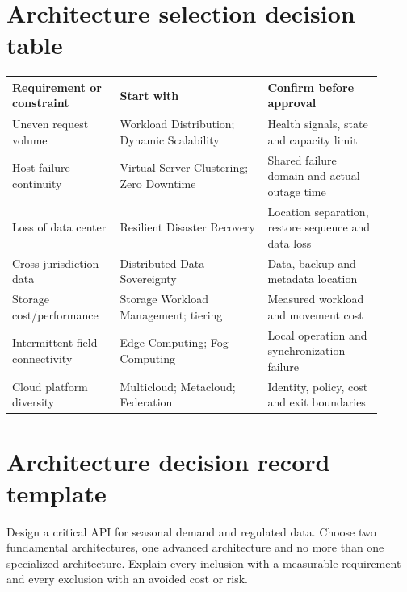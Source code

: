 \documentclass[10pt,letterpaper]{article}
\begin{document}
\section{Architecture selection decision table}
\small\begin{longtable}{p{0.26\linewidth}p{0.36\linewidth}p{0.29\linewidth}}
\toprule Requirement or constraint & Start with & Confirm before approval \\\midrule
Uneven request volume & Workload Distribution; Dynamic Scalability & Health signals, state and capacity limit \\
Host failure continuity & Virtual Server Clustering; Zero Downtime & Shared failure domain and actual outage time \\
Loss of data center & Resilient Disaster Recovery & Location separation, restore sequence and data loss \\
Cross-jurisdiction data & Distributed Data Sovereignty & Data, backup and metadata location \\
Storage cost/performance & Storage Workload Management; tiering & Measured workload and movement cost \\
Intermittent field connectivity & Edge Computing; Fog Computing & Local operation and synchronization failure \\
Cloud platform diversity & Multicloud; Metacloud; Federation & Identity, policy, cost and exit boundaries \\\bottomrule
\end{longtable}\normalsize
\section{Architecture decision record template}
\begin{workbox}[title={Pattern composition challenge}]
Design a critical API for seasonal demand and regulated data. Choose two fundamental architectures, one advanced architecture and no more than one specialized architecture. Explain every inclusion with a measurable requirement and every exclusion with an avoided cost or risk.
\end{workbox}

\end{document}

